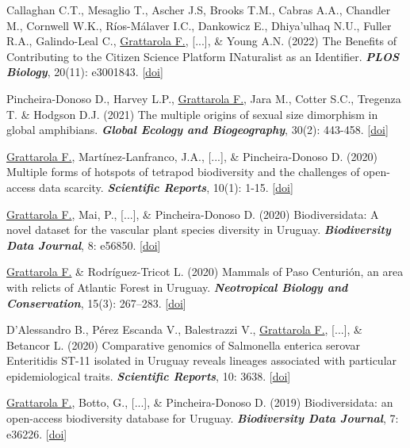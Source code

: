 \documentclass[9pt]{developercv} %
\begin{document}
\begin{etaremune}
\item Callaghan C.T., Mesaglio T., Ascher J.S, Brooks T.M., Cabras A.A., Chandler M., Cornwell W.K., Ríos-Málaver I.C., Dankowicz E., Dhiya’ulhaq N.U., Fuller R.A., Galindo-Leal C., \underline{Grattarola F.}, [...], \& Young A.N. (2022) The Benefits of Contributing to the Citizen Science Platform INaturalist as an Identifier. \textit{\textbf{PLOS Biology}}, 20(11): e3001843. [\href{https://doi.org/10.1371/journal.pbio.3001843}{doi}]

\item Pincheira-Donoso D., Harvey L.P., \underline{Grattarola F.}, Jara M., Cotter S.C., Tregenza T. \& Hodgson D.J. (2021) The multiple origins of sexual size dimorphism in global amphibians. \textit{\textbf{Global Ecology and Biogeography}}, 30(2): 443-458. [\href{https://doi.org/10.1111/geb.13230}{doi}]

\item \underline{Grattarola F.}, Martínez-Lanfranco, J.A., [...], \& Pincheira-Donoso D. (2020) Multiple forms of hotspots of tetrapod biodiversity and the challenges of open-access data scarcity. \textit{\textbf{Scientific Reports}}, 10(1): 1-15. [\href{https://doi.org/10.1038/s41598-020-79074-8}{doi}]

\item \underline{Grattarola F.}, Mai, P., [...], \& Pincheira-Donoso D. (2020) Biodiversidata: A novel dataset for the vascular plant species diversity in Uruguay. \textit{\textbf{Biodiversity Data Journal}}, 8: e56850. [\href{https://doi.org/10.3897/BDJ.8.e56850}{doi}]

\item \underline{Grattarola F.} \& Rodríguez-Tricot L. (2020) Mammals of Paso Centurión, an area with relicts of Atlantic Forest in Uruguay. \textit{\textbf{Neotropical Biology and Conservation}}, 15(3): 267–283. [\href{https://doi.org/10.3897/neotropical.15.e53062}{doi}]

\item D’Alessandro B., Pérez Escanda V., Balestrazzi V., \underline{Grattarola F.}, [...], \& Betancor L.  (2020) Comparative genomics of Salmonella enterica serovar Enteritidis ST-11 isolated in Uruguay reveals lineages associated with particular epidemiological traits. \textit{\textbf{Scientific Reports}}, 10: 3638. [\href{https://doi.org/10.1038/s41598-020-60502-8}{doi}]

\item \underline{Grattarola F.}, Botto, G., [...], \& Pincheira-Donoso D. (2019) Biodiversidata: an open-access biodiversity database for Uruguay. \textit{\textbf{Biodiversity Data Journal}}, 7: e36226. [\href{https://doi.org/10.3897/BDJ.7.e36226}{doi}]


\end{etaremune}
\end{document}
